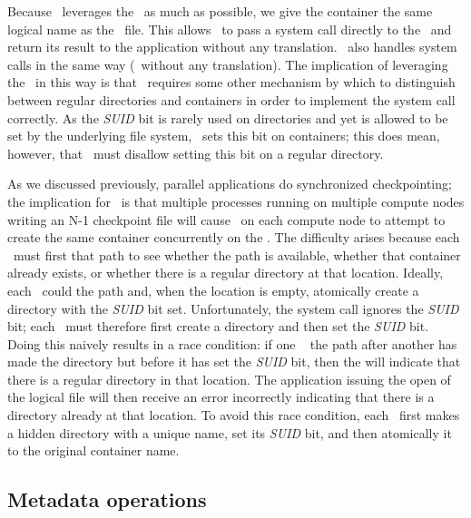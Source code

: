Because \plfs\ leverages the \upfs\ as much as possible, we give the container
the same logical name as the \plfs\ file. This allows \plfs\ to pass a
 system call directly to the \upfs\ and return its result to
the application without any translation.  \plfs\ also handles 
system calls in the same way (\ie\ without any translation). The implication of
leveraging the \upfs\ in this way is that \plfs\ requires some other mechanism
by which to distinguish between regular directories and containers in order to
implement the  system call correctly. As the \textit{SUID} bit is
rarely used on directories and yet is allowed to be set by the underlying file
system, \plfs\ sets this bit on containers; this does mean, however, that
\plfs\ must disallow setting this bit on a regular directory. 

As we discussed previously, parallel applications do synchronized
checkpointing; the implication for \plfs\ is that multiple processes running on
multiple compute nodes writing an N-1 checkpoint file will cause
\plfs\ on each compute node to attempt to create the same container
concurrently on the \upfs. The difficulty arises because each \plfs\ must first
 that path to see whether the path is available, whether that
container already exists, or whether there is a regular directory at that
location. Ideally, each \plfs\ could  the path and, when the
location is empty, atomically create a
directory with the \textit{SUID} bit set. Unfortunately, the 
system call ignores the \textit{SUID} bit; each \plfs\ must therefore first
create a directory and then set the \textit{SUID} bit. Doing this
naively results in a race condition: if one \plfs\  the path
after another has made the directory but before it has set the \textit{SUID}
bit, then the  will indicate that there is a regular directory in
that location. The application issuing the open of the logical file will then
receive an error incorrectly indicating that there is a directory already at
that location. To avoid this race condition, each \plfs\ first makes a
hidden directory with a unique name, set its \textit{SUID} bit, and then
atomically  it to the original container name.

\subsection{Metadata operations}
\label{arch-meta}

